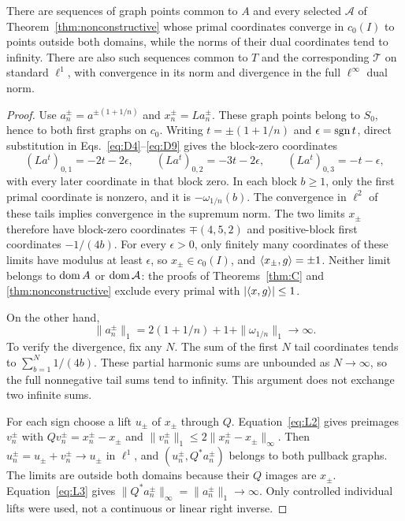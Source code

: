 \begin{proposition}
\label{prop:boundary-sequences}
There are sequences of graph points common to $A$ and every selected
$\mathcal A$ of Theorem~\ref{thm:nonconstructive} whose primal
coordinates converge in $c_0(I)$ to points outside both domains,
while the norms of their dual coordinates tend to infinity.
There are also such sequences common to $T$ and the corresponding
$\mathcal T$ on standard $\ell^1$, with convergence in its norm
and divergence in the full $\ell^\infty$ dual norm.
\end{proposition}
\begin{proof}
Use $a_n^\pm=a^{\pm(1+1/n)}$ and $x_n^\pm=La_n^\pm$. These graph points
belong to $S_0$, hence to both first graphs on $c_0$.
Writing $t=\pm(1+1/n)$ and $\epsilon=\operatorname{sgn} t$, direct substitution in
Eqs.~\eqref{eq:D4}--\eqref{eq:D9} gives the block-zero coordinates
\[
(La^t)_{0,1}=-2t-2\epsilon,\qquad
(La^t)_{0,2}=-3t-2\epsilon,\qquad
(La^t)_{0,3}=-t-\epsilon,
\]
with every later coordinate in that block zero. In each block $b\ge1$,
only the first primal coordinate is nonzero, and it is
$-\omega_{1/n}(b)$. The convergence in $\ell^2$ of these tails implies
convergence in the supremum norm. The two limits $x_\pm$ therefore have
block-zero coordinates $\mp(4,5,2)$ and positive-block first coordinates
$-1/(4b)$. For every $\epsilon>0$, only finitely many coordinates of
these limits have modulus at least $\epsilon$, so $x_\pm\in c_0(I)$, and
$\langle x_\pm,g\rangle=\pm1$. Neither limit belongs to $\operatorname{dom} A$ or
$\operatorname{dom}\mathcal A$: the proofs of Theorems~\ref{thm:C} and
\ref{thm:nonconstructive} exclude every primal with
$|\langle x,g\rangle|\le1$.

On the other hand,
\[
\|a_n^\pm\|_1=2(1+1/n)+1+\|\omega_{1/n}\|_1\longrightarrow\infty.
\]
To verify the divergence, fix any $N$. The sum of the first $N$ tail
coordinates tends to $\sum_{b=1}^N1/(4b)$. These partial harmonic sums
are unbounded as $N\to\infty$, so the full nonnegative tail sums tend
to infinity. This argument does not exchange two infinite sums.

For each sign choose a lift $u_\pm$ of $x_\pm$ through $Q$.
Equation~\eqref{eq:L2} gives preimages $v_n^\pm$ with
$Qv_n^\pm=x_n^\pm-x_\pm$ and
$\|v_n^\pm\|_1\le2\|x_n^\pm-x_\pm\|_\infty$.
Then $u_n^\pm=u_\pm+v_n^\pm\to u_\pm$ in $\ell^1$, and
$(u_n^\pm,Q^*a_n^\pm)$ belongs to both pullback graphs. The limits
are outside both domains because their $Q$ images are $x_\pm$.
Equation~\eqref{eq:L3} gives
$\|Q^*a_n^\pm\|_\infty=\|a_n^\pm\|_1\to\infty$.
Only controlled individual lifts were used, not a continuous or linear
right inverse.
\end{proof}

